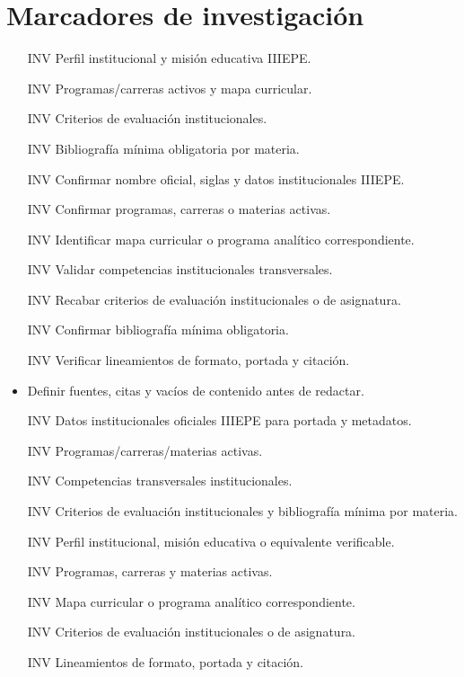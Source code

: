 \documentclass[12pt]{article}
\begin{document}
\section*{Marcadores de investigación}
\begin{itemize}[leftmargin=*]
  \item [INV] Perfil institucional y misión educativa IIIEPE.
  \item [INV] Programas/carreras activos y mapa curricular.
  \item [INV] Criterios de evaluación institucionales.
  \item [INV] Bibliografía mínima obligatoria por materia.
  \item [INV] Confirmar nombre oficial, siglas y datos institucionales IIIEPE.
  \item [INV] Confirmar programas, carreras o materias activas.
  \item [INV] Identificar mapa curricular o programa analítico correspondiente.
  \item [INV] Validar competencias institucionales transversales.
  \item [INV] Recabar criterios de evaluación institucionales o de asignatura.
  \item [INV] Confirmar bibliografía mínima obligatoria.
  \item [INV] Verificar lineamientos de formato, portada y citación.
  \item Definir fuentes, citas y vacíos de contenido antes de redactar.
  \item [INV] Datos institucionales oficiales IIIEPE para portada y metadatos.
  \item [INV] Programas/carreras/materias activas.
  \item [INV] Competencias transversales institucionales.
  \item [INV] Criterios de evaluación institucionales y bibliografía mínima por materia.
  \item [INV] Perfil institucional, misión educativa o equivalente verificable.
  \item [INV] Programas, carreras y materias activas.
  \item [INV] Mapa curricular o programa analítico correspondiente.
  \item [INV] Criterios de evaluación institucionales o de asignatura.
  \item [INV] Lineamientos de formato, portada y citación.
\end{itemize}
\end{document}
